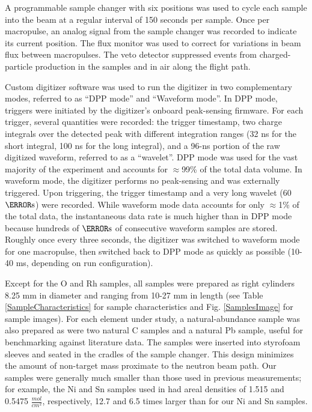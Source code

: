 \documentclass[twocolumn,secnumarabic,amssymb, nobibnotes, aps, prl,
superscriptaddress, nobalancelastpage]{revtex4}
\begin{document}
A programmable sample changer with six positions
was used to cycle each sample into the beam at a regular interval of 150 seconds 
per sample. Once per macropulse, an analog signal from the sample changer
was recorded to indicate its current position.
The flux monitor was used to correct for variations in beam flux between 
macropulses. The veto detector suppressed events from charged-particle production 
in the samples and in air along the flight path.

Custom digitizer software was used to run the 
digitizer in two complementary modes, referred to as ``DPP mode'' and ``Waveform 
mode''. In DPP mode, triggers were initiated by the digitizer's onboard
peak-sensing firmware. For each trigger, several quantities were recorded: the trigger 
timestamp, two charge integrals over the detected peak with different
integration ranges (32 ns for the short integral, 100 ns for the long integral),
and a 96-ns portion of the raw digitized waveform, referred to as a ``wavelet''.
DPP mode was used for the vast majority of the 
experiment and accounts for $\approx$99\% of the total data volume. In waveform mode, 
the digitizer performs no peak-sensing and was externally triggered. Upon 
triggering, the trigger timestamp and a very long wavelet (60 $\micro\second$) 
were recorded. While waveform mode data accounts for only $\approx$1\% of the total data, 
the instantaneous data rate is much higher than in DPP 
mode because hundreds of $\micro\second$ of consecutive waveform samples are 
stored. Roughly once every three seconds, the digitizer was switched to 
waveform mode for one macropulse, then switched back to DPP mode as quickly as
possible (10-40 ms, depending on run configuration).  

Except for the O and Rh samples, all samples were prepared as right
cylinders 8.25 mm in diameter and ranging from 10-27 mm in length (see
Table \ref{SampleCharacteristics} for sample characteristics and Fig. \ref{SamplesImage}
for sample images). For each element under study, a natural-abundance sample
was also prepared as were two natural C
samples and a natural Pb sample, useful for benchmarking against
literature data. The samples
were inserted into styrofoam sleeves and seated in the cradles of the sample
changer. This design minimizes the amount of non-target mass proximate to the
neutron beam path. Our samples were generally
much smaller than those used in previous measurements;
for example, the Ni and Sn samples used in \cite{Abfalterer2001,
Finlay1993} had areal densities of 1.515 and 0.5475
$\frac{mol}{cm^{2}}$, respectively, 12.7 and 6.5 times larger than for our
Ni and Sn samples. 
\end{document}

